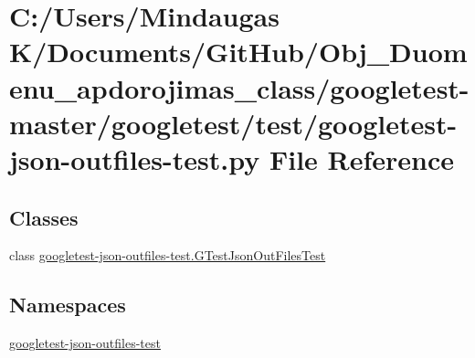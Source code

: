 \hypertarget{googletest-master_2googletest_2test_2googletest-json-outfiles-test_8py}{}\section{C\+:/\+Users/\+Mindaugas K/\+Documents/\+Git\+Hub/\+Obj\+\_\+\+Duomenu\+\_\+apdorojimas\+\_\+class/googletest-\/master/googletest/test/googletest-\/json-\/outfiles-\/test.py File Reference}
\label{googletest-master_2googletest_2test_2googletest-json-outfiles-test_8py}
\subsection*{Classes}
\begin{DoxyCompactItemize}
\item 
class \mbox{\hyperlink{classgoogletest-json-outfiles-test_1_1_g_test_json_out_files_test}{googletest-\/json-\/outfiles-\/test.\+G\+Test\+Json\+Out\+Files\+Test}}
\end{DoxyCompactItemize}
\subsection*{Namespaces}
\begin{DoxyCompactItemize}
\item 
 \mbox{\hyperlink{namespacegoogletest-json-outfiles-test}{googletest-\/json-\/outfiles-\/test}}
\end{DoxyCompactItemize}
